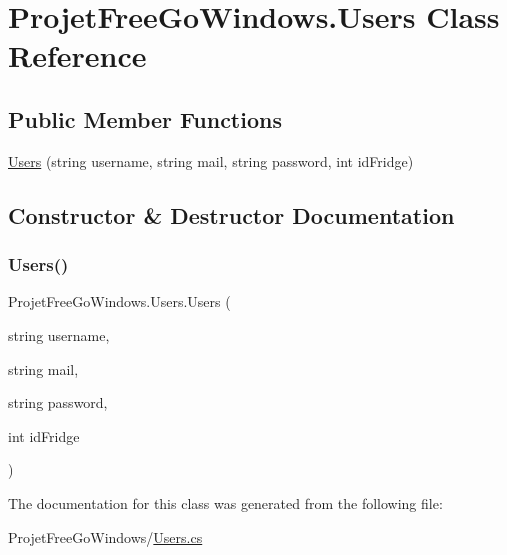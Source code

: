 \hypertarget{class_projet_free_go_windows_1_1_users}{}\section{Projet\+Free\+Go\+Windows.\+Users Class Reference}
\label{class_projet_free_go_windows_1_1_users}
\subsection*{Public Member Functions}
\begin{DoxyCompactItemize}
\item 
\hyperlink{class_projet_free_go_windows_1_1_users_a8752ecd76b038f515c6a8708b761e044}{Users} (string username, string mail, string password, int id\+Fridge)
\end{DoxyCompactItemize}


\subsection{Constructor \& Destructor Documentation}
\mbox{\label{class_projet_free_go_windows_1_1_users_a8752ecd76b038f515c6a8708b761e044}} 
\subsubsection{\texorpdfstring{Users()}{Users()}}
{\footnotesize\ttfamily Projet\+Free\+Go\+Windows.\+Users.\+Users (\begin{DoxyParamCaption}\item[{string}]{username,  }\item[{string}]{mail,  }\item[{string}]{password,  }\item[{int}]{id\+Fridge }\end{DoxyParamCaption})}



The documentation for this class was generated from the following file\+:\begin{DoxyCompactItemize}
\item 
Projet\+Free\+Go\+Windows/\hyperlink{_users_8cs}{Users.\+cs}\end{DoxyCompactItemize}
